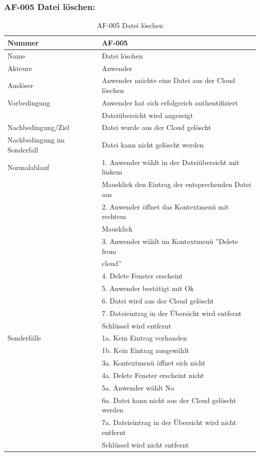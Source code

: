 \documentclass[13pt,a4paper,bibliography=totocnumbered,listof=totocnumbered]{scrartcl}
\begin{document}
\subsubsection{AF-005 Datei l\"oschen:}
\begin{table}[!h]
	\centering
	\begin{tabular}{|l|l|}
		\hline
		Nummer & AF-005\\
		\hline
		Name & Datei löschen\\
		\hline
		Akteure & Anwender\\
		\hline
		Auslöser & Anwender möchte eine Datei aus der Cloud löschen\\
		\hline
		Vorbedingung & Anwender hat sich erfolgreich authentifiziert \\ & Dateiübersicht wird angezeigt\\
		\hline
		Nachbedingung/Ziel & Datei wurde aus der Cloud gelöscht \\
		\hline
		Nachbedingung im Sonderfall & Datei kann nicht gelöscht werden \\
		\hline
		Normalablauf & 1. Anwender wählt in der Dateiübersicht mit linkem \\&Mausklick den Eintrag der entsprechenden Datei aus \\ & 2. Anwender öffnet das Kontextmenü mit rechtem\\& Mausklick \\ & 3. Anwender wählt im Kontextmenü ''Delete from \\&cloud'' \\ & 4. Delete Fenster erscheint \\ & 5. Anwender bestätigt mit Ok \\  & 6. Datei wird aus der Cloud gelöscht \\ & 7. Dateieintrag in der Übersicht wird entfernt \\& Schlüssel wird entfernt \\
		\hline
		Sonderfälle & 1a. Kein Eintrag vorhanden\\& 1b. Kein Eintrag ausgewählt\\ & 3a. Kontextmenü öffnet sich nicht \\ & 4a. Delete Fenster erscheint nicht \\ & 5a. Anwender wählt No \\ & 6a. Datei kann nicht aus der Cloud gelöscht werden \\ & 7a. Dateieintrag in der Übersicht wird nicht entfernt\\& Schlüssel wird nicht entfernt\\
		\hline
	\end{tabular}
	\caption{AF-005 Datei löschen}
	\label{tab:AF-005 Datei loeschen}
\end{table}
\pagebreak
\end{document}
